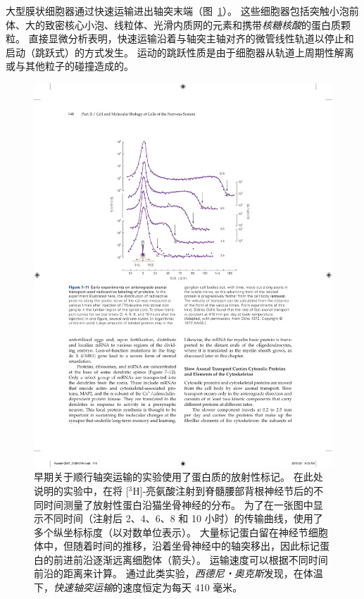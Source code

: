 大型膜状细胞器通过快速运输进出轴突末端（图~\ref{fig:7_11}）。
这些细胞器包括突触小泡前体、大的致密核心小泡、线粒体、光滑内质网的元素和携带\textit{核糖核酸}的蛋白质颗粒。
直接显微分析表明，快速运输沿着与轴突主轴对齐的微管线性轨道以停止和启动（跳跃式）的方式发生。
运动的跳跃性质是由于细胞器从轨道上周期性解离或与其他粒子的碰撞造成的。


\begin{figure}[htbp]
	\centering
	\includegraphics[width=1.0\linewidth]{chap07/fig_7_11}
	\caption{早期关于顺行轴突运输的实验使用了蛋白质的放射性标记。
		在此处说明的实验中，在将 [$^3$H]-亮氨酸注射到脊髓腰部背根神经节后的不同时间测量了放射性蛋白沿猫坐骨神经的分布。
		为了在一张图中显示不同时间（注射后 2、4、6、8 和 10 小时）的传输曲线，使用了多个纵坐标标度（以对数单位表示）。
		大量标记蛋白留在神经节细胞体中，但随着时间的推移，沿着坐骨神经中的轴突移出，因此标记蛋白的前进前沿逐渐远离细胞体（箭头）。
		运输速度可以根据不同时间前沿的距离来计算。
		通过此类实验，\textit{西德尼‧奥克斯}发现，在体温下，\textit{快速轴突运输}的速度恒定为每天 410 毫米\cite{ochs1972fast}。}
	\label{fig:7_11}
\end{figure}


